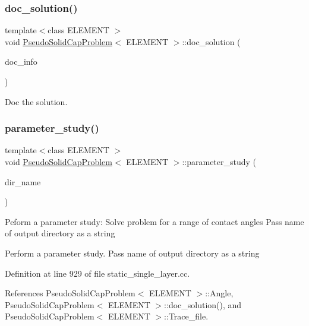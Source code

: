 \subsubsection{\texorpdfstring{doc\+\_\+solution()}{doc\_solution()}\hspace{0.1cm}{\footnotesize\ttfamily [2/2]}}
{\footnotesize\ttfamily template$<$class E\+L\+E\+M\+E\+NT $>$ \\
void \hyperlink{classPseudoSolidCapProblem}{Pseudo\+Solid\+Cap\+Problem}$<$ E\+L\+E\+M\+E\+NT $>$\+::doc\+\_\+solution (\begin{DoxyParamCaption}\item[{Doc\+Info \&}]{doc\+\_\+info }\end{DoxyParamCaption})}



Doc the solution. 

\mbox{\label{classPseudoSolidCapProblem_ae86ecaf62fa0920f5d14bf82a7f83b0e}} 
\subsubsection{\texorpdfstring{parameter\+\_\+study()}{parameter\_study()}\hspace{0.1cm}{\footnotesize\ttfamily [1/2]}}
{\footnotesize\ttfamily template$<$class E\+L\+E\+M\+E\+NT $>$ \\
void \hyperlink{classPseudoSolidCapProblem}{Pseudo\+Solid\+Cap\+Problem}$<$ E\+L\+E\+M\+E\+NT $>$\+::parameter\+\_\+study (\begin{DoxyParamCaption}\item[{const string \&}]{dir\+\_\+name }\end{DoxyParamCaption})}

Peform a parameter study\+: Solve problem for a range of contact angles Pass name of output directory as a string

Perform a parameter study. Pass name of output directory as a string 

Definition at line 929 of file static\+\_\+single\+\_\+layer.\+cc.



References Pseudo\+Solid\+Cap\+Problem$<$ E\+L\+E\+M\+E\+N\+T $>$\+::\+Angle, Pseudo\+Solid\+Cap\+Problem$<$ E\+L\+E\+M\+E\+N\+T $>$\+::doc\+\_\+solution(), and Pseudo\+Solid\+Cap\+Problem$<$ E\+L\+E\+M\+E\+N\+T $>$\+::\+Trace\+\_\+file.



